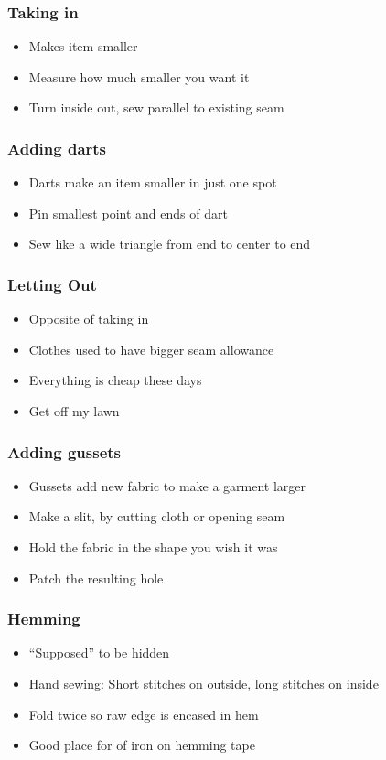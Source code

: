 \documentclass{beamer}
\begin{document}
\begin{frame}[fragile]
\frametitle{Taking in}
\begin{itemize}
\item Makes item smaller
\item Measure how much smaller you want it
\item Turn inside out, sew parallel to existing seam
\end{itemize}
\end{frame}

\begin{frame}[fragile]
\frametitle{Adding darts}
\begin{itemize}
\item Darts make an item smaller in just one spot
\item Pin smallest point and ends of dart
\item Sew like a wide triangle from end to center to end
\end{itemize}
\end{frame}

\begin{frame}[fragile]
\frametitle{Letting Out}
\begin{itemize}
\item Opposite of taking in
\item Clothes used to have bigger seam allowance
\item Everything is cheap these days
\item Get off my lawn
\end{itemize}
\end{frame}

\begin{frame}[fragile]
\frametitle{Adding gussets}
\begin{itemize}
\item Gussets add new fabric to make a garment larger
\item Make a slit, by cutting cloth or opening seam
\item Hold the fabric in the shape you wish it was
\item Patch the resulting hole
\end{itemize}
\end{frame}

\begin{frame}[fragile]
\frametitle{Hemming}
\begin{itemize}
\item ``Supposed'' to be hidden
\item Hand sewing: Short stitches on outside, long stitches on inside
\item Fold twice so raw edge is encased in hem
\item Good place for of iron on hemming tape
\end{itemize}
\end{frame}
\end{document}
